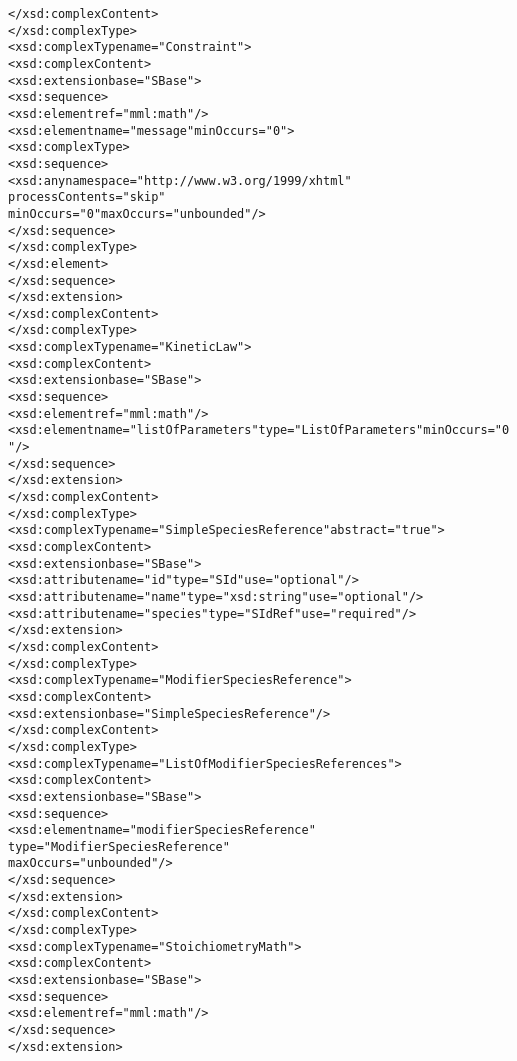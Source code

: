 \begin{alltt}
        </xsd:complexContent>
    </xsd:complexType>
    <xsd:complexType name="Constraint">
        <xsd:complexContent>
            <xsd:extension base="SBase">
                <xsd:sequence>
                    <xsd:element ref="mml:math"/>
                    <xsd:element name="message" minOccurs="0">
                        <xsd:complexType>
                            <xsd:sequence>
                                <xsd:any namespace="http://www.w3.org/1999/xhtml" 
                                         processContents="skip" 
                                         minOccurs="0" maxOccurs="unbounded"/>
                            </xsd:sequence>
                        </xsd:complexType>
                    </xsd:element>
                </xsd:sequence>
            </xsd:extension>
        </xsd:complexContent>
    </xsd:complexType>
    <xsd:complexType name="KineticLaw">
        <xsd:complexContent>
            <xsd:extension base="SBase">
                <xsd:sequence>
                    <xsd:element ref="mml:math"/>
                    <xsd:element name="listOfParameters" type="ListOfParameters" minOccurs="0"/>
                </xsd:sequence>
            </xsd:extension>
        </xsd:complexContent>
    </xsd:complexType>
    <xsd:complexType name="SimpleSpeciesReference" abstract="true">
        <xsd:complexContent>
            <xsd:extension base="SBase">
                <xsd:attribute name="id" type="SId" use="optional"/>
                <xsd:attribute name="name" type="xsd:string" use="optional"/>
                <xsd:attribute name="species" type="SIdRef" use="required"/>
            </xsd:extension>
        </xsd:complexContent>
    </xsd:complexType>
    <xsd:complexType name="ModifierSpeciesReference">
        <xsd:complexContent>
            <xsd:extension base="SimpleSpeciesReference"/>
        </xsd:complexContent>
    </xsd:complexType>
    <xsd:complexType name="ListOfModifierSpeciesReferences">
        <xsd:complexContent>
            <xsd:extension base="SBase">
                <xsd:sequence>
                    <xsd:element name="modifierSpeciesReference" 
                                 type="ModifierSpeciesReference" 
                                 maxOccurs="unbounded"/>
                </xsd:sequence>
            </xsd:extension>
        </xsd:complexContent>
    </xsd:complexType>
    <xsd:complexType name="StoichiometryMath">
        <xsd:complexContent>
            <xsd:extension base="SBase">
                <xsd:sequence>
                    <xsd:element ref="mml:math"/>
                </xsd:sequence>
            </xsd:extension>

\end{alltt}
